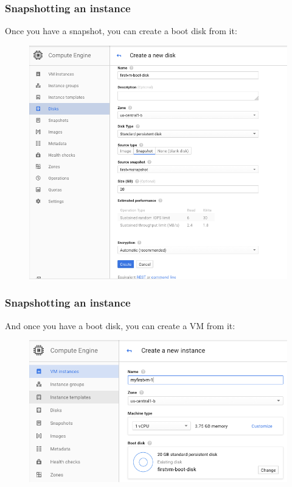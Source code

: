 \documentclass[9pt]{beamer}
\begin{document}
\begin{frame}[fragile]
  \frametitle{Snapshotting an instance}
  Once you have a snapshot, you can create a boot disk from it:
\begin{figure}
  \includegraphics[scale=0.3]{figures/BootDisk.png}
\end{figure}
\end{frame}

\begin{frame}[fragile]
  \frametitle{Snapshotting an instance}
  And once you have a boot disk, you can create a VM from it:
  \begin{figure}
    \includegraphics[scale=0.3]{figures/VMFromBootDisk.png}
  \end{figure}
\end{frame}
\end{document}
